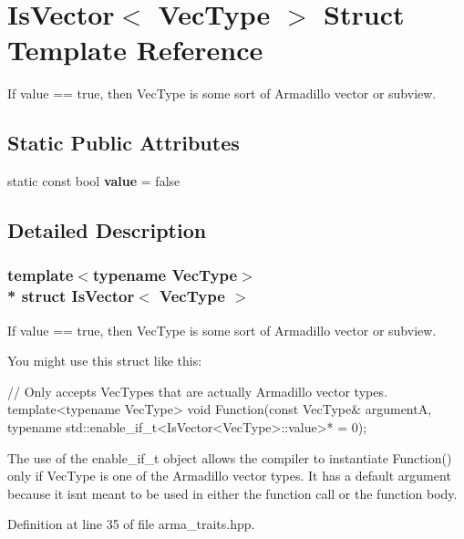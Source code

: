 \section{Is\+Vector$<$ Vec\+Type $>$ Struct Template Reference}
\label{structIsVector}


If value == true, then Vec\+Type is some sort of Armadillo vector or subview.  


\subsection*{Static Public Attributes}
\begin{DoxyCompactItemize}
\item 
static const bool {\bf value} = false
\end{DoxyCompactItemize}


\subsection{Detailed Description}
\subsubsection*{template$<$typename Vec\+Type$>$\\*
struct Is\+Vector$<$ Vec\+Type $>$}

If value == true, then Vec\+Type is some sort of Armadillo vector or subview. 

You might use this struct like this\+:


\begin{DoxyCode}
\textcolor{comment}{// Only accepts VecTypes that are actually Armadillo vector types.}
\textcolor{keyword}{template}<\textcolor{keyword}{typename} VecType>
\textcolor{keywordtype}{void} Function(\textcolor{keyword}{const} VecType& argumentA,
              \textcolor{keyword}{typename} std::enable_if_t<IsVector<VecType>::value>* = 0);
\end{DoxyCode}


The use of the enable\+\_\+if\+\_\+t object allows the compiler to instantiate Function() only if Vec\+Type is one of the Armadillo vector types. It has a default argument because it isn\textquotesingle{}t meant to be used in either the function call or the function body. 

Definition at line 35 of file arma\+\_\+traits.\+hpp.



